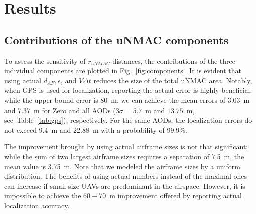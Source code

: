 \documentclass[10pt,conference]{IEEEtran}
\begin{document}
\section{Results}
\subsection{Contributions of the uNMAC components}
To assess the sensitivity of $r_{uNMAC}$ distances, the contributions of the three individual components are plotted in Fig.~\ref{fig:components}. It is evident that using actual $d_{AF}, \epsilon_{}$, and $V\Delta t$ reduces the size of the total uNMAC area. Notably, when GPS is used for localization, reporting the actual error is highly beneficial: while the upper bound error is 80~m, we can achieve the mean errors of 3.03~m and 7.37~m for Zero and all AODs ($3\sigma=5.7$~m and $13.75$~m, see~Table~\ref{tab:gps}), respectively. For the same AODs, the localization errors do not exceed 9.4~m and 22.88~m with a probability of 99.9\%.

The improvement brought by using actual airframe sizes is not that significant: while the sum of two largest airframe sizes requires a separation of 7.5~m, the mean value is 3.75~m. Note that we modeled the airframe sizes by a uniform distribution. The benefits of using actual numbers instead of the maximal ones can increase if small-size UAVs are predominant in the airspace. However, it is impossible to achieve the $60-70$~m improvement offered by reporting actual localization accuracy.
\end{document}
